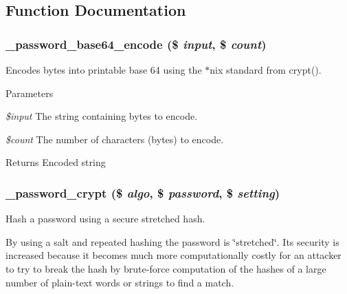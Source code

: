 \subsection{Function Documentation}
\hypertarget{password_8inc_ab987820d3546d9284a976236fa42fa59}{
\subsubsection[{\_\-password\_\-base64\_\-encode}]{\setlength{\rightskip}{0pt plus 5cm}\_\-password\_\-base64\_\-encode (\$ {\em input}, \/  \$ {\em count})}}
\label{password_8inc_ab987820d3546d9284a976236fa42fa59}
Encodes bytes into printable base 64 using the $\ast$nix standard from crypt().


\begin{DoxyParams}{Parameters}
\item[{\em \$input}]The string containing bytes to encode. \item[{\em \$count}]The number of characters (bytes) to encode.\end{DoxyParams}
\begin{DoxyReturn}{Returns}
Encoded string 
\end{DoxyReturn}
\hypertarget{password_8inc_a857b6008d6928c55df3823524d5c30d2}{
\subsubsection[{\_\-password\_\-crypt}]{\setlength{\rightskip}{0pt plus 5cm}\_\-password\_\-crypt (\$ {\em algo}, \/  \$ {\em password}, \/  \$ {\em setting})}}
\label{password_8inc_a857b6008d6928c55df3823524d5c30d2}
Hash a password using a secure stretched hash.

By using a salt and repeated hashing the password is \char`\"{}stretched\char`\"{}. Its security is increased because it becomes much more computationally costly for an attacker to try to break the hash by brute-\/force computation of the hashes of a large number of plain-\/text words or strings to find a match.


